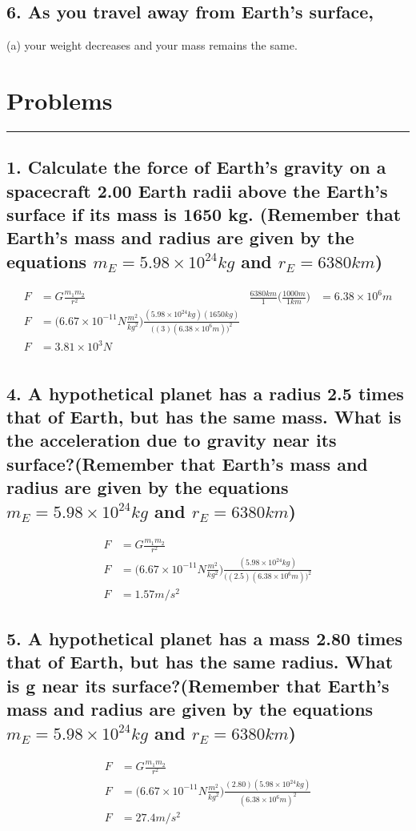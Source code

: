 \documentclass[12pt,a4paper,english]{article}
\begin{document}
\begin{flushleft}
  \subsection{6. As you travel away from Earth's surface,}
  (a) your weight decreases and your mass remains the same. 
  \pagebreak
  \section*{Problems}
  \hrule
  \subsection{1. Calculate the force of Earth's gravity on a spacecraft 2.00 Earth radii above the Earth's surface if its mass is 1650 kg. (Remember that Earth's mass and radius are given by the equations $m_E=5.98\times10^{24}kg$ and $r_E=6380km$)}
  \begin{align*}
    F&=G\frac{m_1m_2}{r^2} 
     &\frac{6380km}{1}\biggr(\frac{1000m}{1km}\biggr)&=6.38\times10^{6}m
    \\
    F&=\biggr(6.67\times10^{-11}N\frac{m^2}{kg^2}\biggr)\frac{(5.98\times10^{24}kg)(1650kg)}{\bigr((3)(6.38\times10^6m)\bigr)^2} 
    \\
    F&=3.81\times10^{3}N
    \\
  \end{align*}
  \subsection{4. A hypothetical planet has a radius 2.5 times that of Earth, but has the same mass. What is the acceleration due to gravity near its surface?(Remember that Earth's mass and radius are given by the equations $m_E=5.98\times10^{24}kg$ and $r_E=6380km$)}
  \begin{align*}
    F&=G\frac{m_1m_2}{r^2} 
    \\
    F&=\biggr(6.67\times10^{-11}N\frac{m^2}{kg^2}\biggr)\frac{(5.98\times10^{24}kg)}{\bigr((2.5)(6.38\times10^6m)\bigr)^2} 
    \\
    F&=1.57m/s^2
  \end{align*}
  \subsection{5. A hypothetical planet has a mass 2.80 times that of Earth, but has the same radius. What is g near its surface?(Remember that Earth's mass and radius are given by the equations $m_E=5.98\times10^{24}kg$ and $r_E=6380km$)}
  \begin{align*}
    F&=G\frac{m_1m_2}{r^2} 
    \\
    F&=\biggr(6.67\times10^{-11}N\frac{m^2}{kg^2}\biggr)\frac{(2.80)(5.98\times10^{24}kg)}{(6.38\times10^6m)^2} 
    \\
    F&=27.4m/s^2
  \end{align*}

\end{flushleft}
\end{document}
